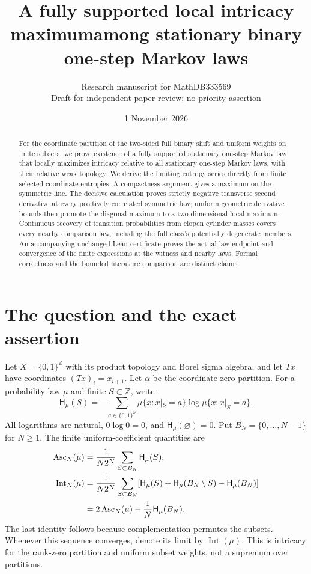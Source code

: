 \documentclass[11pt]{article}
\title{A fully supported local intricacy maximum\newline among stationary binary one-step Markov laws}
\author{Research manuscript for MathDB333569\\\small Draft for independent paper review; no priority assertion}
\date{1 November 2026}
\newcommand{\HH}{\mathsf H}
\newcommand{\Int}{\operatorname{Int}}
\newcommand{\Asc}{\operatorname{Asc}}
\begin{document}
\sloppy
\maketitle
\begin{abstract}
For the coordinate partition of the two-sided full binary shift and uniform weights on finite subsets, we prove existence of a fully supported stationary one-step Markov law that locally maximizes intricacy relative to all stationary one-step Markov laws, with their relative weak topology. We derive the limiting entropy series directly from finite selected-coordinate entropies. A compactness argument gives a maximum on the symmetric line. The decisive calculation proves strictly negative transverse second derivative at every positively correlated symmetric law; uniform geometric derivative bounds then promote the diagonal maximum to a two-dimensional local maximum. Continuous recovery of transition probabilities from clopen cylinder masses covers every nearby comparison law, including the full class's potentially degenerate members. An accompanying unchanged Lean certificate proves the actual-law endpoint and convergence of the finite expressions at the witness and nearby laws. Formal correctness and the bounded literature comparison are distinct claims.
\end{abstract}

\section{The question and the exact assertion}
Let $X=\{0,1\}^{\mathbb Z}$ with its product topology and Borel sigma algebra, and let $T x$ have coordinates $(Tx)_i=x_{i+1}$. Let $\alpha$ be the coordinate-zero partition. For a probability law $\mu$ and finite $S\subset\mathbb Z$, write
\[
 \HH_\mu(S)=-\sum_{a\in\{0,1\}^{S}}\mu\{x:x|_S=a\}\log\mu\{x:x|_S=a\}.
\]
All logarithms are natural, $0\log0=0$, and $\HH_\mu(\varnothing)=0$. Put $B_N=\{0,\ldots,N-1\}$ for $N\geq1$. The finite uniform-coefficient quantities are
\begin{align}
 \Asc_N(\mu)&=\frac1{N2^N}\sum_{S\subset B_N}\HH_\mu(S),\label{asc}\\
 \Int_N(\mu)&=\frac1{N2^N}\sum_{S\subset B_N}
 [\HH_\mu(S)+\HH_\mu(B_N\setminus S)-\HH_\mu(B_N)]\notag\\
 &=2\Asc_N(\mu)-\frac1N\HH_\mu(B_N).\label{finite}
\end{align}
The last identity follows because complementation permutes the subsets. Whenever this sequence converges, denote its limit by $\Int(\mu)$. This is intricacy for the rank-zero partition and uniform subset weights, not a supremum over partitions.
\end{document}
